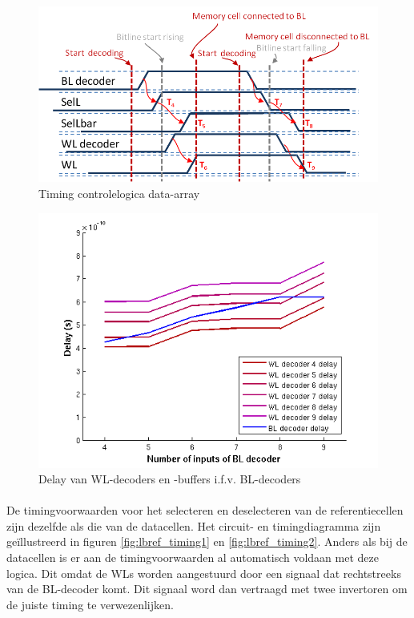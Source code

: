 \begin{figure}[!ht]
  \centering
  \includegraphics[scale=0.9]{../fig/hfdstk-timing-lbcell2.png}
  \caption{Timing controlelogica data-array}
  \label{fig:lbcell_timing2}
\end{figure}

\begin{figure}[!ht]
  \centering
  \includegraphics[scale=0.6]{../fig/hfdstk-timing-decoder-dep.png}
  \caption{Delay van WL-decoders en -buffers i.f.v. BL-decoders}
  \label{fig:decoder_dep}
\end{figure}

\paragraph{}
De timingvoorwaarden voor het selecteren en deselecteren van de referentiecellen zijn dezelfde als die van de datacellen. Het circuit- en timingdiagramma zijn geïllustreerd in figuren \ref{fig:lbref_timing1} en \ref{fig:lbref_timing2}. Anders als bij de datacellen is er aan de timingvoorwaarden al automatisch voldaan met deze logica. Dit omdat de WLs worden aangestuurd door een signaal dat rechtstreeks van de BL-decoder komt. Dit signaal word dan vertraagd met twee invertoren om de juiste timing te verwezenlijken.


